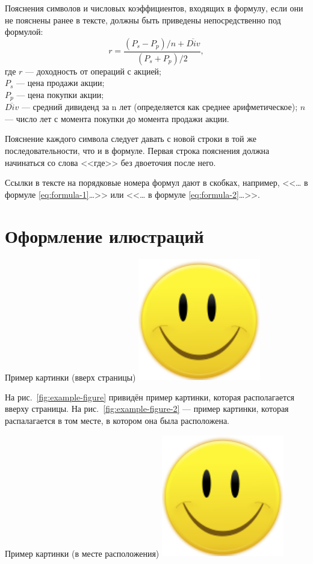 \documentclass[PI,VKR]{HSEUniversity}
\begin{document}
Пояснения символов и числовых коэффициентов, входящих в формулу, если они не пояснены ранее в тексте, должны быть приведены непосредственно под формулой:
\begin{equation}
	r = \frac{(P_s-P_p)/n + \overline{Div}}{(P_s + P_p)/2},
	\label{eq:formula-2}
\end{equation}
где $r$ --- доходность от операций с акцией;\\
$P_s$ --- цена продажи акции;\\
$P_p$ --- цена покупки акции;\\
$\overline{Div}$ --- средний дивиденд за n лет (определяется как среднее арифметическое); 
$n$ --- число лет с момента покупки до момента продажи акции.

Пояснение каждого символа следует давать с новой строки в той же последовательности, что и в формуле. Первая строка пояснения должна начинаться со слова <<где>> без двоеточия после него.

Ссылки в тексте на порядковые номера формул дают в скобках, например, <<\dots{} в формуле \eqref{eq:formula-1}\dots>> или <<\dots{} в формуле \eqref{eq:formula-2}\dots>>.

\section{Оформление илюстраций}

\begin{FIGURE}[t]{Пример картинки (вверх страницы)\label{fig:example-figure}}
	\includegraphics[width=0.4\textwidth]{img/fig}
\end{FIGURE}

На рис.~\ref{fig:example-figure} привидён пример картинки, которая располагается вверху страницы. На рис.~\ref{fig:example-figure-2} --- пример картинки, которая распалагается в том месте, в котором она была расположена.

\begin{FIGURE}[h]{Пример картинки (в месте расположения) \label{fig:example-figure-2}}
	\includegraphics[width=0.4\textwidth]{img/fig}
\end{FIGURE}
\end{document}
